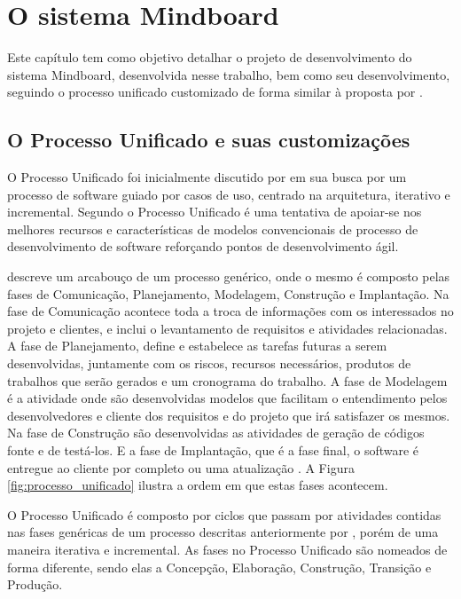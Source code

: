




\chapter{O sistema Mindboard}
\label{cap:mindboard}

Este capítulo tem como objetivo detalhar o projeto de desenvolvimento do sistema Mindboard, desenvolvida nesse trabalho, bem como seu desenvolvimento, seguindo o processo unificado customizado de forma similar à proposta por .

\section{O Processo Unificado e suas customizações}

O Processo Unificado foi inicialmente discutido por  em sua busca por um processo de software guiado por casos de uso, centrado na arquitetura, iterativo e incremental. Segundo  o Processo Unificado é uma tentativa de apoiar-se nos melhores recursos e características de modelos convencionais de processo de desenvolvimento de software reforçando pontos de desenvolvimento ágil.

 descreve um arcabouço de um processo genérico, onde o mesmo é composto pelas fases de Comunicação, Planejamento, Modelagem, Construção e Implantação. Na fase de Comunicação acontece toda a troca de informações com os interessados no projeto e clientes, e inclui o levantamento de requisitos e atividades relacionadas. A fase de Planejamento, define e estabelece as tarefas futuras a serem desenvolvidas, juntamente com os riscos, recursos necessários, produtos de trabalhos que serão gerados e um cronograma do trabalho. A fase de Modelagem é a atividade onde são desenvolvidas modelos que facilitam o entendimento pelos desenvolvedores e cliente dos requisitos e do projeto que irá satisfazer os mesmos. Na fase de Construção são desenvolvidas as atividades de geração de códigos fonte e de testá-los. E a fase de Implantação, que é a fase final, o software é entregue ao cliente por completo ou uma atualização \cite{pressman06}. A Figura \ref{fig:processo_unificado} ilustra a ordem em que estas fases acontecem.

O Processo Unificado é composto por ciclos que passam por atividades contidas nas fases genéricas de um processo descritas anteriormente por , porém de uma maneira iterativa e incremental. As fases no Processo Unificado são nomeados de forma diferente, sendo elas a Concepção, Elaboração, Construção, Transição e Produção.

